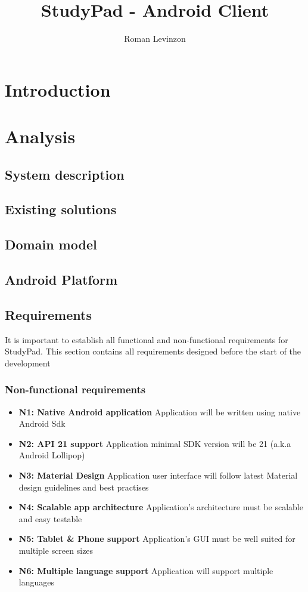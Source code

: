\documentclass[thesis=B,english]{FITthesis}[2012/10/20]
\title{StudyPad - Android Client}
\author{Roman Levinzon} %
\newcommand{\appname}{StudyPad\/}
\begin{document}

\chapter{Introduction}



\chapter{Analysis}
\section{System description}
\section{Existing solutions}
\section{Domain model}
\section{Android Platform}

\newpage
\section{Requirements}
It is important to establish all functional and non-functional requirements for \appname. This section contains all requirements designed before the start
of the development

\subsection{Non-functional requirements}

\begin{itemize}
  \item \textbf{N1: Native Android application}  Application will be written using native Android Sdk
  \item \textbf{N2: API 21 support} Application minimal SDK version will be 21 (a.k.a Android Lollipop)
  \item \textbf{N3: Material Design} Application user interface will follow latest Material design guidelines and best practises
  \item \textbf{N4: Scalable app architecture} Application's architecture must be scalable and easy testable
  \item \textbf{N5: Tablet \& Phone support} Application's GUI must be well suited for multiple screen sizes
  \item \textbf{N6: Multiple language support} Application will support multiple languages
\end{itemize}
\end{document}
